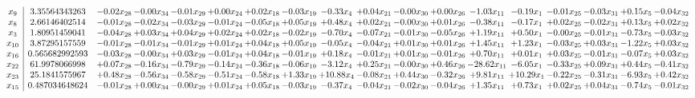\documentclass[9pt]{article}
\begin{document}
 \[\begin{array}{c| c c@{\hskip 2pt} c@{\hskip 2pt} c@{\hskip 2pt} c@{\hskip 2pt} c@{\hskip 2pt} c@{\hskip 2pt} c@{\hskip 2pt} c@{\hskip 2pt} c@{\hskip 2pt} c@{\hskip 2pt} c@{\hskip 2pt} c@{\hskip 2pt} c@{\hskip 2pt} c@{\hskip 2pt} c@{\hskip 2pt} c@{\hskip 2pt} }
 x_{9}   &  3.35564343263 & -0.02 x_{28} & -0.00 x_{34} & -0.01 x_{29} & +  0.00 x_{24} & +  0.02 x_{18} & -0.03 x_{19} & -0.33 x_{4} & +  0.04 x_{21} & -0.00 x_{30} & +  0.00 x_{26} & -1.03 x_{11} & -0.19 x_{1} & -0.01 x_{25} & -0.03 x_{31} & +  0.15 x_{5} & -0.04 x_{32}\\
 x_{8}   &  2.66146402514 & -0.01 x_{28} & -0.02 x_{34} & -0.03 x_{29} & -0.01 x_{24} & -0.05 x_{18} & +  0.05 x_{19} & +  0.48 x_{4} & +  0.02 x_{21} & -0.00 x_{30} & +  0.01 x_{26} & -0.38 x_{11} & -0.17 x_{1} & +  0.02 x_{25} & -0.02 x_{31} & +  0.13 x_{5} & +  0.02 x_{32}\\
 x_{3}   &  1.80951459041 & -0.04 x_{28} & +  0.03 x_{34} & +  0.04 x_{29} & +  0.02 x_{24} & +  0.02 x_{18} & -0.02 x_{19} & -0.70 x_{4} & -0.07 x_{21} & -0.01 x_{30} & -0.05 x_{26} & +  1.19 x_{11} & +  0.50 x_{1} & -0.00 x_{25} & -0.01 x_{31} & -0.73 x_{5} & -0.03 x_{32}\\
 x_{10}   &  3.87295157559 & -0.01 x_{28} & -0.01 x_{34} & -0.01 x_{29} & +  0.01 x_{24} & +  0.04 x_{18} & +  0.05 x_{19} & -0.05 x_{4} & -0.04 x_{21} & +  0.01 x_{30} & +  0.01 x_{26} & +  1.45 x_{11} & +  1.23 x_{1} & -0.03 x_{25} & +  0.03 x_{31} & -1.22 x_{5} & +  0.03 x_{32}\\
 x_{16}   &  0.565682992593 & -0.03 x_{28} & -0.00 x_{34} & +  0.03 x_{29} & -0.01 x_{24} & +  0.04 x_{18} & -0.01 x_{19} & +  0.18 x_{4} & -0.01 x_{21} & +  0.01 x_{30} & -0.01 x_{26} & +  0.70 x_{11} & +  0.01 x_{1} & +  0.03 x_{25} & -0.01 x_{31} & -0.07 x_{5} & +  0.03 x_{32}\\
 x_{22}   &  61.9978066998 & +  0.07 x_{28} & -0.16 x_{34} & -0.79 x_{29} & -0.14 x_{24} & -0.36 x_{18} & -0.06 x_{19} & -3.12 x_{4} & +  0.25 x_{21} & -0.00 x_{30} & +  0.46 x_{26} & -28.62 x_{11} & -6.05 x_{1} & -0.33 x_{25} & +  0.09 x_{31} & +  0.44 x_{5} & -0.41 x_{32}\\
 x_{23}   &  25.1841575967 & +  0.48 x_{28} & -0.56 x_{34} & -0.58 x_{29} & -0.51 x_{24} & -0.58 x_{18} & +  1.33 x_{19} & + 10.88 x_{4} & -0.08 x_{21} & +  0.44 x_{30} & -0.32 x_{26} & +  9.81 x_{11} & + 10.29 x_{1} & -0.22 x_{25} & -0.31 x_{31} & -6.93 x_{5} & +  0.42 x_{32}\\
 x_{15}   &  0.487034648624 & -0.01 x_{28} & +  0.00 x_{34} & -0.00 x_{29} & +  0.01 x_{24} & +  0.05 x_{18} & -0.03 x_{19} & -0.37 x_{4} & -0.04 x_{21} & -0.02 x_{30} & -0.04 x_{26} & +  1.35 x_{11} & +  0.73 x_{1} & +  0.02 x_{25} & +  0.04 x_{31} & -0.74 x_{5} & -0.01 x_{32}\\

\end{array}\]
\end{document}
